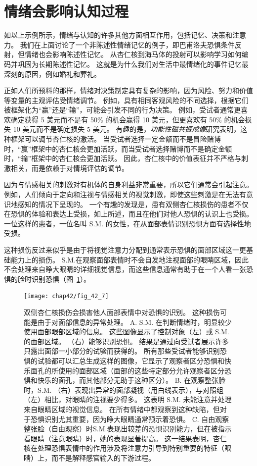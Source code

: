 \section{情绪会影响认知过程}

如以上示例所示，情绪与认知的许多其他方面相互作用，包括记忆、决策和注意力。
我们在上面讨论了一个非陈述性情绪记忆的例子，即巴甫洛夫恐惧条件反射，但情绪也会影响陈述性记忆。
从杏仁核到海马体的投射可以影响学习如何编码并巩固为长期陈述性记忆。
这就是为什么我们对生活中最情绪化的事件记忆最深刻的原因，例如婚礼和葬礼。


正如人们所预料的那样，情绪对决策制定具有复杂的影响，因为风险、努力和价值等变量的主观评估受情绪调节。
例如，具有相同客观风险的不同选择，根据它们被框架化为“赢”还是“输”，可能会引发不同的行为决策。
例如，受试者通常更喜欢确定获得 5 美元而不是有 50\% 的机会赢得 10 美元，但更喜欢有 50\% 的机会损失 10 美元而不是确定损失 5 美元。
有趣的是，\textit{功能性磁共振成像}研究表明，这种框架可以调节杏仁核的激活。
当受试者选择一定金额而不是冒险赌博时，“赢”框架中的杏仁核会更加活跃，而当受试者选择赌博而不是确定金额时，“输”框架中的杏仁核会更加活跃。
因此，杏仁核中的价值表征并不严格与刺激相关，而是依赖于对情境评估的调节。


因为与情感相关的刺激对有机体的自身利益非常重要，所以它们通常会引起注意。
例如，人们倾向于定向和注视与情感相关的视觉刺激，即使这些刺激是在无法有意识地感知的情况下呈现的。
一个有趣的发现是，患有双侧杏仁核损伤的患者不仅在恐惧的体验和表达上受损，如上所述，而且在他们对他人恐惧的认识上也受损。
一位这样的患者，一位名叫 S.M. 的女性，在从面部表情识别恐惧方面有选择性地受损。

这种损伤反过来似乎是由于将视觉注意力分配到通常表示恐惧的面部区域这一更基础能力上的损伤。
S.M.在观察面部表情时不会自发地注视面部的眼睛区域，因此不会处理来自睁大眼睛的详细视觉信息，而这些信息通常有助于在一个人看一张恐惧的脸时识别恐惧（图~\ref{fig:42_7}）。




\begin{figure}[htbp]
	\centering
	\texttt{[image: chap42/fig\_42\_7]}
	\caption{双侧杏仁核损伤会损害他人面部表情中对恐惧的识别。
		这种损伤可能是由于对面部信息的异常处理。
		A. S.M. 在判断情绪时，明显较少使用面部眼部区域的信息。
		这些图像显示了控制对象（左）或 S.M. 的面部区域。
		（右）能够识别恐惧。
		结果是通过向受试者展示许多只露出面部一小部分的试验而获得的。
		所有那些受试者能够识别恐惧的试验都可以汇总生成这样的图像，它显示了观察者区分恐惧和快乐面孔的所使用的面部区域（面部的这些特定部分允许观察者区分恐惧和快乐的面孔，而其他部分无助于这种区分）。
		B. 在观察整张脸时，S.M. （右）表现出异常的面部凝视（用白线表示），与对照组（左）相比，对眼睛的注视要少得多。
		这表明 S.M. 未能注意并处理来自眼睛区域的视觉信息。
		在所有情绪中都观察到这种缺陷，但对于恐惧识别尤其重要，因为睁大眼睛通常预示着恐惧。
		C. 自由观察整张脸（自由观察）时S.M.表现出较差的恐惧识别能力，但在被指示看眼睛（注意眼睛）时，她的表现显著提高。
		这一结果表明，杏仁核在处理恐惧表情中的作用涉及将注意力引导到特别重要的特征（眼睛）上，而不是解释感官输入的下游过程。}
	\label{fig:42_7}
\end{figure}


